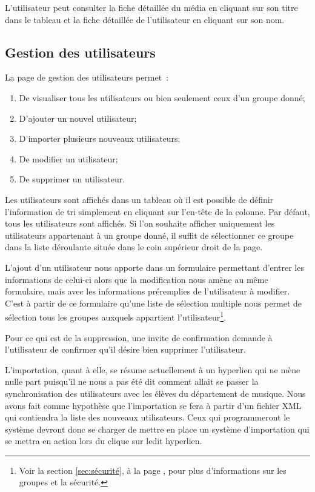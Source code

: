 \documentclass[letter, 11pt]{report}
\begin{document}
L'utilisateur peut consulter la fiche détaillée du média en cliquant sur son titre dans le tableau et la fiche détaillée de l'utilisateur en cliquant sur son nom.

\subsection{Gestion des utilisateurs}
La page de gestion des utilisateurs permet~:
\begin{enumerate}
	\item De visualiser tous les utilisateurs ou bien seulement ceux d'un groupe donné;
	\item D'ajouter un nouvel utilisateur;
	\item D'importer plusieurs nouveaux utilisateurs;
	\item De modifier un utilisateur;
	\item De supprimer un utilisateur.
\end{enumerate}

Les utilisateurs sont affichés dans un tableau où il est possible de définir l'information de tri simplement en cliquant sur l'en-tête de la colonne. Par défaut, tous les utilisateurs sont affichés. Si l'on souhaite afficher uniquement les utilisateurs appartenant à un groupe donné, il suffit de sélectionner ce groupe dans la liste déroulante située dans le coin supérieur droit de la page.

L'ajout d'un utilisateur nous apporte dans un formulaire permettant d'entrer les informations de celui-ci alors que la modification nous amène au même formulaire, mais avec les informations préremplies de l'utilisateur à modifier. C'est à partir de ce formulaire qu'une liste de sélection multiple nous permet de sélection tous les groupes auxquels appartient l'utilisateur\footnote{Voir la section \ref{sec:sécurité}, à la page \pageref{sec:sécurité}, pour plus d'informations sur les groupes et la sécurité.}.

Pour ce qui est de la suppression, une invite de confirmation demande à l'utilisateur de confirmer qu'il désire bien supprimer l'utilisateur.

L'importation, quant à elle, se résume actuellement à un hyperlien qui ne mène nulle part puisqu'il ne nous a pas été dit comment allait se passer la synchronisation des utilisateurs avec les élèves du département de musique. Nous avons fait comme hypothèse que l'importation se fera à partir d'un fichier XML qui contiendra la liste des nouveaux utilisateurs. Ceux qui programmeront le système devront donc se charger de mettre en place un système d'importation qui se mettra en action lors du clique sur ledit hyperlien.
\end{document}
